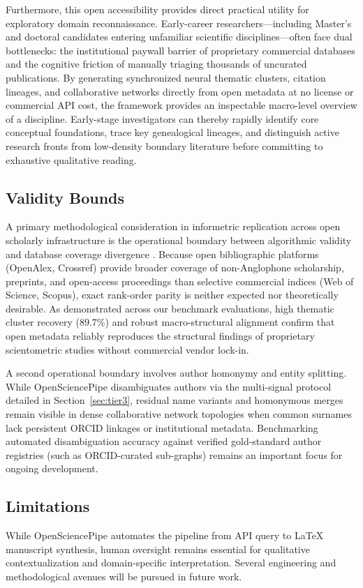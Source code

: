 \documentclass[preprint,12pt]{elsarticle}
\begin{document}
Furthermore, this open accessibility provides direct practical utility for exploratory domain reconnaissance. Early-career researchers---including Master's and doctoral candidates entering unfamiliar scientific disciplines---often face dual bottlenecks: the institutional paywall barrier of proprietary commercial databases and the cognitive friction of manually triaging thousands of uncurated publications. By generating synchronized neural thematic clusters, citation lineages, and collaborative networks directly from open metadata at no license or commercial API cost, the framework provides an inspectable macro-level overview of a discipline. Early-stage investigators can thereby rapidly identify core conceptual foundations, trace key genealogical lineages, and distinguish active research fronts from low-density boundary literature before committing to exhaustive qualitative reading.

\subsection{Validity Bounds}
\label{sec:validity}
A primary methodological consideration in informetric replication across open scholarly infrastructure is the operational boundary between algorithmic validity and database coverage divergence \cite{visser2021large, martin2021google}. Because open bibliographic platforms (OpenAlex, Crossref) provide broader coverage of non-Anglophone scholarship, preprints, and open-access proceedings than selective commercial indices (Web of Science, Scopus), exact rank-order parity is neither expected nor theoretically desirable. As demonstrated across our benchmark evaluations, high thematic cluster recovery ($89.7\%$) and robust macro-structural alignment confirm that open metadata reliably reproduces the structural findings of proprietary scientometric studies without commercial vendor lock-in.

A second operational boundary involves author homonymy and entity splitting. While OpenSciencePipe disambiguates authors via the multi-signal protocol detailed in Section~\ref{sec:tier3}, residual name variants and homonymous merges remain visible in dense collaborative network topologies when common surnames lack persistent ORCID linkages or institutional metadata. Benchmarking automated disambiguation accuracy against verified gold-standard author registries (such as ORCID-curated sub-graphs) remains an important focus for ongoing development.

\subsection{Limitations}
While OpenSciencePipe automates the pipeline from API query to \LaTeX{} manuscript synthesis, human oversight remains essential for qualitative contextualization and domain-specific interpretation. Several engineering and methodological avenues will be pursued in future work. 
\end{document}
